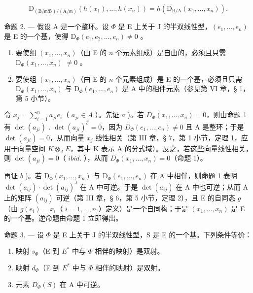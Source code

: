 \[
\mathrm{D} _ {(\mathrm{B} / \mathfrak {m B}) / (\mathrm{A} / \mathfrak {m})} (h (x _ {1}), \dots , h (x _ {n})) = h (\mathrm{D} _ {\mathrm{B} / \mathrm{A}} (x _ {1}, \dots , x _ {n})).
\]

命题 2. --- 假设 A 是一个整环。设 \(\Phi\) 是 E 上关于 J 的半双线性型，\((e_1, \ldots, e_n)\) 是 E 的一个基，使得 \(\mathrm{D}_{\Phi}(e_1, e_2, \ldots, e_n) \neq 0\) 。

\begin{enumerate}
\def\labelenumi{\alph{enumi})}
\item
  要使组 \((x_{1},\ldots ,x_{n})\)（由 E 的 \(n\) 个元素组成）是自由的，必须且只需 \(\mathrm{D}_{\Phi}(x_1,\dots,x_n)\) \(\neq 0\) 。
\item
  要使组 \((x_{1},\ldots ,x_{n})\)（由 E 的 \(n\) 个元素组成）是 E 的一个基，必须且只需 \(\mathrm{D}_{\Phi}(x_1,\dots,x_n)\) 与 \(\mathrm{D}_{\Phi}(e_1,\dots,e_n)\) 是 A 中的相伴元素（参见第 VI 章，§ 1，第 5 小节）。
\end{enumerate}

令 \(x_j = \sum_{i=1}^{n} a_{ji} e_i\)（ \(a_{ji} \in A\) ）。先证 \(a\) )。若 \(D_{\Phi}(x_1, \ldots, x_n) = 0\)，则由命题 1 有 \(\det(a_{ji})\) . \(\det(a_{ji})^{\mathfrak{J}} = 0\)，因为 \(D_{\Phi}(e_1, \ldots, e_n) \neq 0\) 且 A 是整环；于是 \(\det(a_{ji}) = 0\)，从而向量 \(x_j\) 线性相关（第 III 章，§ 7，第 1 小节，定理 1，应用于向量空间 \(K \otimes_A E\)，其中 K 表示 A 的分式域）。反之，若这些向量线性相关，则 \(\det(a_{ji}) = 0\)（ \(ibid.\) ），从而 \(D_{\Phi}(x_1, \ldots, x_n) = 0\)（命题 1）。

再证 \(b\) )。若 \(\mathrm{D}_{\Phi}(x_1, \ldots, x_n)\) 与 \(\mathrm{D}_{\Phi}(e_1, \ldots, e_n)\) 在 A 中相伴，则命题 1 表明 \(\det(a_{ij}) \cdot \det(a_{ij})^{\mathrm{J}}\) 在 A 中可逆。于是 \(\det(a_{ij})\) 在 A 中也可逆；从而 A 上的矩阵 \((a_{ij})\) 可逆（第 III 章，§ 6，第 5 小节，定理 2），且 E 的自同态 \(g\)（由 \(g(e_i) = x_i\)（ \(i = 1, \ldots, n\) ）定义）是一个自同构；于是 \((x_1, \ldots, x_n)\) 是 E 的一个基。逆命题由命题 1 立即得出。

命题 3. --- 设 \(\Phi\) 是 E 上关于 J 的半双线性型，S 是 E 的一个基。下列条件等价：

\begin{enumerate}
\def\labelenumi{\alph{enumi})}
\item
  映射 \(s_{\Phi}\)（E 到 \(E^{*}\) 中与 \(\Phi\) 相伴的映射）是双射。
\item
  映射 \(d_{\Phi}\)（E 到 \(E^{*}\) 中与 \(\Phi\) 相伴的映射）是双射。
\item
  元素 \(D_{\Phi}(S)\) 在 A 中可逆。
\end{enumerate}


